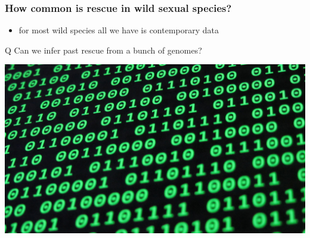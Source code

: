 \documentclass{beamer}
\begin{document}

\begin{frame}
	\frametitle{How common is rescue in wild sexual species?}

	\begin{itemize}
		\item for most wild species all we have is contemporary data \pause
	\end{itemize}

	\begin{block}{Q}
		Can we infer past rescue from a bunch of genomes?
	\end{block}

	\begin{center}
		\includegraphics[width=0.75\linewidth]{../images/code.jpg}
	\end{center}

\end{frame}



\end{document}
